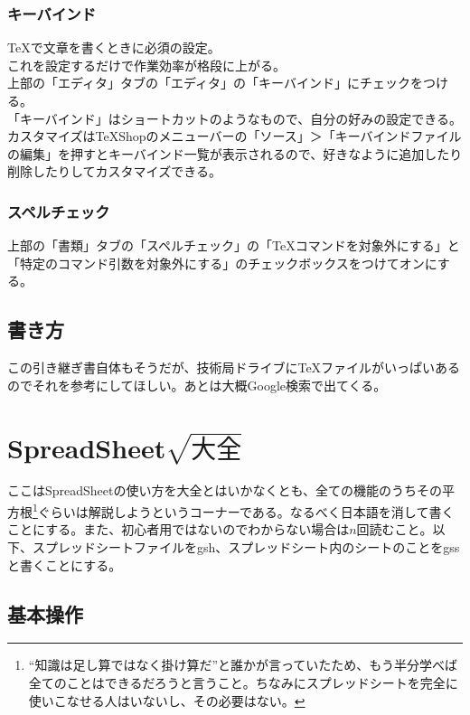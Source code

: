 \documentclass[dvipdfmx,jb5]{jreport}
\begin{document}
\subsubsection{キーバインド}
\TeX で文章を書くときに必須の設定。\\
これを設定するだけで作業効率が格段に上がる。\\
上部の「エディタ」タブの「エディタ」の「キーバインド」にチェックをつける。\\
「キーバインド」はショートカットのようなもので、自分の好みの設定できる。カスタマイズはTeXShopのメニューバーの「ソース」＞「キーバインドファイルの編集」を押すとキーバインド一覧が表示されるので、好きなように追加したり削除したりしてカスタマイズできる。
\subsubsection{スペルチェック}
上部の「書類」タブの「スペルチェック」の「\TeX コマンドを対象外にする」と「特定のコマンド引数を対象外にする」のチェックボックスをつけてオンにする。
\subsection{書き方}
この引き継ぎ書自体もそうだが、技術局ドライブに\TeX ファイルがいっぱいあるのでそれを参考にしてほしい。あとは大概Google検索で出てくる。
\section{SpreadSheet$\sqrt{大全}$}
ここはSpreadSheetの使い方を大全とはいかなくとも、全ての機能のうちその平方根\footnote{``知識は足し算ではなく掛け算だ''と誰かが言っていたため、もう半分学べば全てのことはできるだろうと言うこと。ちなみにスプレッドシートを完全に使いこなせる人はいないし、その必要はない。}ぐらいは解説しようというコーナーである。なるべく日本語を消して書くことにする。また、初心者用ではないのでわからない場合は$n$回読むこと。以下、スプレッドシートファイルをgsh、スプレッドシート内のシートのことをgssと書くことにする。
\subsection{基本操作}
\end{document}
